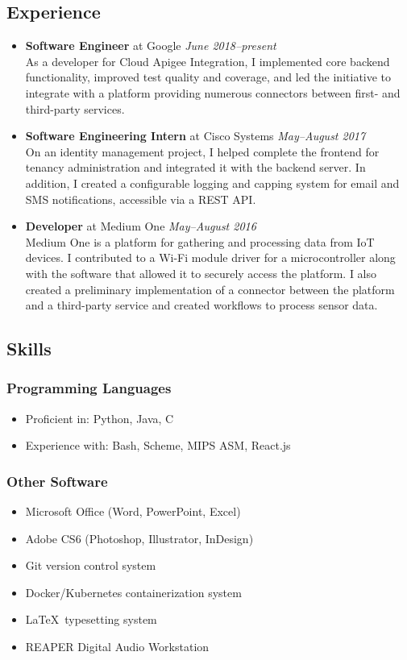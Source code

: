 \documentclass{article}
\begin{document}
\begin{preview}
\subsection*{Experience}
\begin{itemize}
\item \textbf{Software Engineer} at Google \hfill \textit{June 2018--present}\\
As a developer for Cloud Apigee Integration, I implemented core backend functionality, improved test quality and coverage, and led the initiative to integrate with a platform providing numerous connectors between first- and third-party services.
\item \textbf{Software Engineering Intern} at Cisco Systems \hfill \textit{May--August 2017}\\
On an identity management project, I helped complete the frontend for tenancy administration and integrated it with the backend server.  In addition, I created a configurable logging and capping system for email and SMS notifications, accessible via a REST API.
\item \textbf{Developer} at Medium One \hfill \textit{May--August 2016}\\
Medium One is a platform for gathering and processing data from IoT devices.  I contributed to a Wi-Fi module driver for a microcontroller along with the software that allowed it to securely access the platform.  I also created a preliminary implementation of a connector between the platform and a third-party service and created workflows to process sensor data.
\end{itemize}
\subsection*{Skills}
\begin{multicols}{2}
\subsubsection*{Programming Languages}
\begin{itemize}
\item Proficient in: Python, Java, C
\item Experience with: Bash, Scheme, MIPS ASM, React.js
\end{itemize}
\subsubsection*{Other Software}
\begin{itemize}
\item Microsoft Office (Word, PowerPoint, Excel)
\item Adobe CS6 (Photoshop, Illustrator, InDesign)
\item Git version control system
\item Docker/Kubernetes containerization system
\item \LaTeX \ typesetting system
\item REAPER Digital Audio Workstation
\end{itemize}

\end{multicols}
\end{preview}
\end{document}
